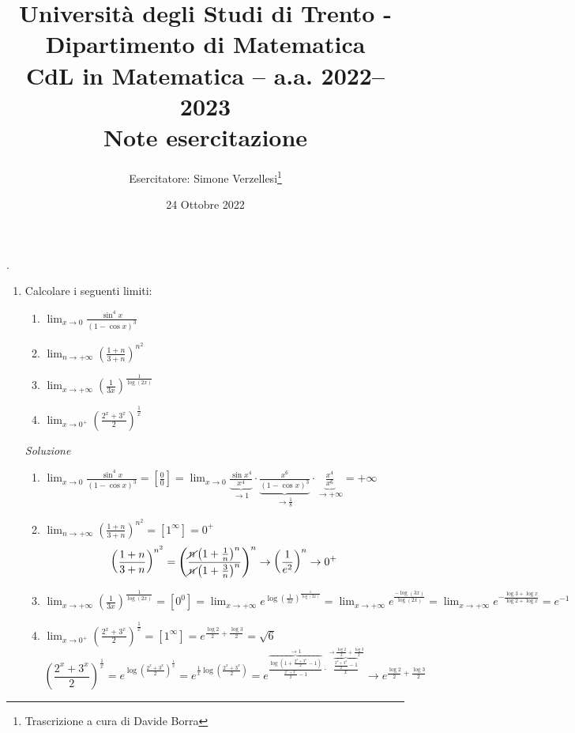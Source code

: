 \documentclass{article}
\title{Università degli Studi di Trento - Dipartimento di Matematica\\
CdL in Matematica – a.a. 2022–2023\\ Note esercitazione}
\author{Esercitatore: Simone Verzellesi\thanks{Trascrizione a cura di Davide Borra}}
\date{24 Ottobre 2022}
\begin{document}
\maketitle
{}
\setlength{\headheight}{30pt}.
\begin{enumerate}[label=\textbf{Esercizio 6.\arabic*.},itemindent=*]
    \item Calcolare i seguenti limiti:
    \begin{enumerate}
        \item $\lim_{x\to0}\frac{\sin^4 x}{(1-\cos x)^3}$
        \item $\lim_{n\to+\infty}\left( \frac{1+n}{3+n} \right)^{n^2}$
        \item $\lim_{x\to+\infty}\left( \frac{1}{3x} \right)^{\frac{1}{\log(2x)}}$
        \item $\lim_{x\to0^+}\left( \frac{2^x+3^x}{2} \right)^\frac{1}{x}$
    \end{enumerate}
    \item[\textit{\large Soluzione~}]~
    \begin{enumerate}
        \item $\lim_{x\to0}\frac{\sin^4 x}{(1-\cos x)^3}=\left[ \frac{0}{0} \right]=\lim_{x\to 0}\underbrace{\frac{\sin x^4}{x^4}}_{\to 1}\cdot \underbrace{\frac{x^6}{(1-\cos x)^3}}_{\to \frac{1}{8}}\cdot \underbrace{\frac{x^4}{x^6}}_{\to +\infty}=+\infty$
        \item $\lim_{n\to+\infty}\left( \frac{1+n}{3+n} \right)^{n^2}=\left[ 1^\infty\right]=0^+$
        \[\left(\frac{1+n}{3+n}\right)^{n^2}=\left(\frac{\cancel{n}\left( 1+\frac{1}{n} \right)^n}{\cancel{n}\left( 1+\frac{3}{n} \right)^n}\right)^{n}\to \left( \frac{1}{e^2} \right)^n\to 0^+\]
        \item $\lim_{x\to+\infty}\left( \frac{1}{3x} \right)^{\frac{1}{\log(2x)}}=\left[ {0}^{0} \right]=\lim_{x\to+\infty}e^{\log\left( \frac{1}{3x} \right)^{\frac{1}{\log(2x)}}}=\lim_{x\to+\infty}e^{\frac{-\log(3x)}{\log(2x)}}=\lim_{x\to+\infty}e^{-\frac{\log 3+\log x}{\log 2+\log x}}=e^{-1}$
        \item $\lim_{x\to0^+}\left( \frac{2^x+3^x}{2} \right)^\frac{1}{x}=\left[ 1^\infty\right]=e^{\frac{\log2}{2}+\frac{\log3}{2}}=\sqrt{6}$
        \[\left( \frac{2^x+3^x}{2} \right)^\frac{1}{x}=e^{\log\left( \frac{2^x+3^x}{2} \right)^\frac{1}{x}}=e^{\frac{1}{x}\log\left( \frac{2^x+3^x}{2} \right)}=e^{\overbrace{\frac{\log\left( 1+\frac{2^x+3^x}{2}-1 \right)}{\frac{2^x+3^x}{2}-1}}^{\to1}\cdot\overbrace{\frac{\frac{2^x+3^x}{2}-1}{x}}^{\to\frac{\log2}{2}+\frac{\log3}{2}}}\to e^{\frac{\log2}{2}+\frac{\log3}{2}}\]

\end{enumerate}
\end{enumerate}
\end{document}
